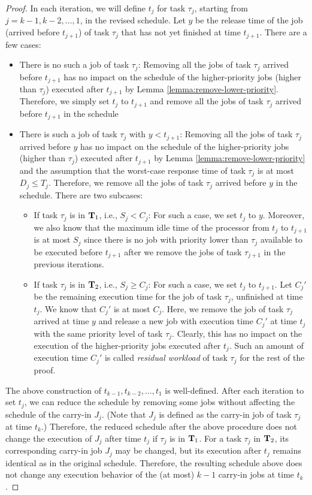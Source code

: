 \begin{proof}
In each iteration, we will define $t_j$ for task $\tau_j$, starting from $j=k-1, k-2, \ldots, 1$, in the revised schedule. Let $y$ be the release time of the job (arrived before $t_{j+1}$) of task $\tau_j$ that has not yet finished at time $t_{j+1}$. There are a few cases:
\begin{itemize}
\item There is no such a job of task $\tau_j$: Removing all the jobs of task $\tau_j$ arrived before $t_{j+1}$ has no impact on the schedule of the higher-priority jobs (higher than $\tau_j$) executed after $t_{j+1}$ by Lemma \ref{lemma:remove-lower-priority}. Therefore, we simply set $t_j$ to $t_{j+1}$ and remove all the jobs of task $\tau_j$ arrived before $t_{j+1}$ in the schedule
\item There is such a job of task $\tau_j$ with $y < t_{j+1}$:  Removing all the jobs of task $\tau_j$ arrived before $y$ has no impact on the schedule of the higher-priority jobs (higher than $\tau_j$) executed after $t_{j+1}$ by Lemma \ref{lemma:remove-lower-priority} and the assumption that the worst-case response time of task $\tau_j$ is at most $D_j \leq T_j$. Therefore, we remove all the jobs of task $\tau_j$ arrived before $y$ in the schedule. There are two subcases:
\begin{itemize}
\item If task $\tau_j$ is in ${\bf T}_1$, i.e., $S_j < C_j$: For such a case, we set $t_{j}$ to $y$. Moreover, we also know that the maximum idle time of the processor from $t_j$ to $t_{j+1}$ is at most $S_j$ since there is no job with priority lower than $\tau_j$ available to be executed before $t_{j+1}$ after we remove the jobs of task $\tau_{j+1}$ in the previous iterations.
\item If task $\tau_j$ is in ${\bf T}_2$, i.e., $S_j \geq C_j$: For such a case, we set $t_{j}$ to $t_{j+1}$. Let $C_j'$ be the remaining execution time for the job of task $\tau_j$, unfinished at time $t_j$. We know that $C_j'$ is at most $C_j$. Here, we remove the job of task $\tau_j$ arrived at time $y$ and release a new job with execution time $C_j'$  at time $t_j$ with the same priority level of task $\tau_j$. Clearly, this has no impact on the execution of the higher-priority jobs executed after $t_j$. Such an amount of execution time $C_j'$ is called \emph{residual workload} of task $\tau_j$ for the rest of the proof.
\end{itemize}
\end{itemize}
 
The above construction of $t_{k-1}, t_{k-2}, \ldots, t_1$ is well-defined. After each iteration to set $t_j$, we can reduce the schedule by removing some jobs without affecting the schedule of the carry-in $J_j$. (Note that $J_j$ is defined as the carry-in job of task $\tau_j$ at time $t_k$.) Therefore, the reduced schedule after the above procedure does not change the execution of $J_j$ after time $t_j$ if $\tau_j$ is in ${\bf T}_1$. For a task $\tau_j$ in ${\bf T}_2$, its corresponding carry-in job $J_j$ may be changed, but its execution after $t_j$ remains identical as in the original schedule. 
Therefore, the resulting schedule above does not change any execution behavior of the (at most) $k-1$ carry-in jobs at time $t_k$.


\end{proof}
